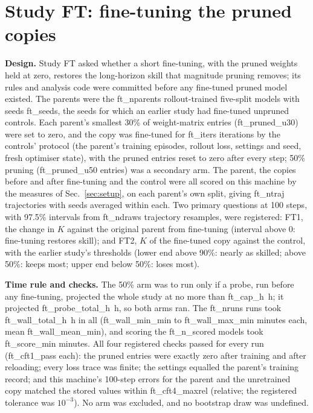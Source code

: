 \section{Study FT: fine-tuning the pruned copies}\label{app:A7}
\textbf{Design.} Study FT asked whether a short fine-tuning, with the pruned weights held at zero, restores the
long-horizon skill that magnitude pruning removes; its rules and analysis code were committed before any fine-tuned pruned model existed. The parents were the {{ft_nparents}} rollout-trained five-split
models with seeds {{ft_seeds}}, the seeds for which an earlier study had fine-tuned unpruned controls. Each parent's
smallest 30\% of weight-matrix entries ({{ft_pruned_u30}}) were set to zero, and the copy was fine-tuned for
{{ft_iters}} iterations by the controls' protocol (the parent's training episodes, rollout loss, settings and seed,
fresh optimiser state), with the pruned entries reset to zero after every step; 50\% pruning ({{ft_pruned_u50}}
entries) was a secondary arm. The parent, the copies before and after fine-tuning and the control were all scored
on this machine by the measures of Sec.~\ref{sec:setup}, on each parent's own split, giving {{ft_ntraj}}
trajectories with seeds averaged within each. Two primary questions at 100 steps, with 97.5\% intervals from
{{ft_ndraws}} trajectory resamples, were registered: FT1, the change in $K$ against the original parent from
fine-tuning (interval above 0: fine-tuning restores skill); and FT2, $K$ of the fine-tuned copy against the control,
with the earlier study's thresholds (lower end above 90\%: nearly as skilled; above 50\%: keeps most; upper end below
50\%: loses most).

\textbf{Time rule and checks.} The 50\% arm was to run only if a probe, run before any fine-tuning, projected the
whole study at no more than {{ft_cap_h}}~h; it projected {{ft_probe_total_h}}~h, so both arms ran. The
{{ft_nruns}} runs took {{ft_wall_total_h}}~h in all ({{ft_wall_min_min}} to {{ft_wall_max_min}} minutes each, mean
{{ft_wall_mean_min}}), and scoring the {{ft_n_scored}} models took {{ft_score_min}} minutes. All four registered checks
passed for every run ({{ft_cft1_pass}} each): the pruned entries were exactly zero after training and after
reloading; every loss trace was finite; the settings equalled the parent's training record; and this machine's
100-step errors for the parent and the unretrained copy matched the stored values within {{ft_cft4_maxrel}}
(relative; the registered tolerance was $10^{-3}$). No arm was excluded, and no bootstrap draw was undefined.

